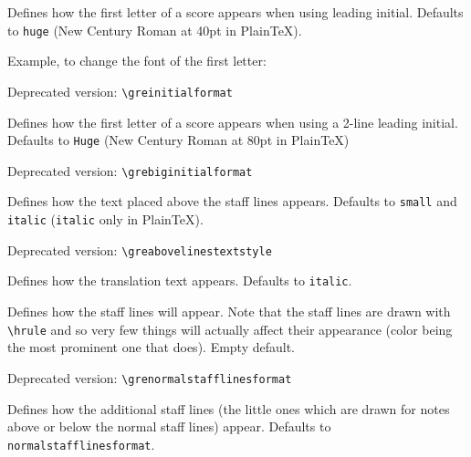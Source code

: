 Defines how the first letter of a score appears when using leading
initial.  Defaults to \verb=huge= (New Century Roman at 40pt in
Plain\TeX).

Example, to change the font of the first letter:

\begin{latexcode}
  \renewenvironment*{initialformat}%
                    {\fontfamily{ppl}\selectfont\huge}{}
\end{latexcode}

\smallskip\hspace{15pt} Deprecated version: \verb=\greinitialformat=

Defines how the first letter of a score appears when using a 2-line
leading initial.  Defaults to \verb=Huge= (New Century Roman at 80pt
in Plain\TeX)

\smallskip\hspace{15pt} Deprecated version: \verb=\grebiginitialformat=

Defines how the text placed above the staff lines appears.  Defaults
to \verb=small= and \verb=italic= (\verb=italic= only in Plain\TeX).

\smallskip\hspace{15pt} Deprecated version: \verb=\greabovelinestextstyle=

Defines how the translation text appears.  Defaults to \verb=italic=.

Defines how the staff lines will appear.  Note that the staff lines
are drawn with \verb=\hrule= and so very few things will actually
affect their appearance (color being the most prominent one that
does).  Empty default.

\smallskip\hspace{15pt} Deprecated version: \verb=\grenormalstafflinesformat=

Defines how the additional staff lines (the little ones which are
drawn for notes above or below the normal staff lines) appear.
Defaults to \verb=normalstafflinesformat=.

